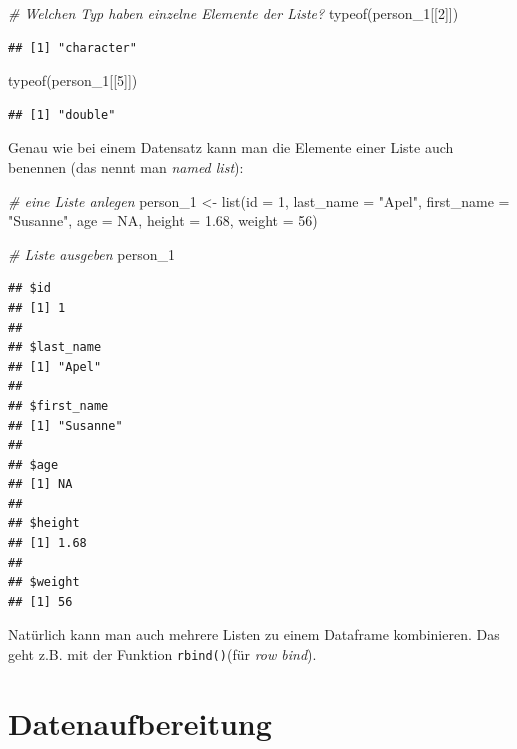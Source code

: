 \documentclass[
]{book}
\newenvironment{Shaded}{\begin{snugshade}}{\end{snugshade}}
\newcommand{\AttributeTok}[1]{\textcolor[rgb]{0.77,0.63,0.00}{#1}}
\newcommand{\CommentTok}[1]{\textcolor[rgb]{0.56,0.35,0.01}{\textit{#1}}}
\newcommand{\ConstantTok}[1]{\textcolor[rgb]{0.00,0.00,0.00}{#1}}
\newcommand{\DecValTok}[1]{\textcolor[rgb]{0.00,0.00,0.81}{#1}}
\newcommand{\FloatTok}[1]{\textcolor[rgb]{0.00,0.00,0.81}{#1}}
\newcommand{\FunctionTok}[1]{\textcolor[rgb]{0.00,0.00,0.00}{#1}}
\newcommand{\NormalTok}[1]{#1}
\newcommand{\OtherTok}[1]{\textcolor[rgb]{0.56,0.35,0.01}{#1}}
\newcommand{\StringTok}[1]{\textcolor[rgb]{0.31,0.60,0.02}{#1}}
\begin{document}
\begin{Shaded}
\begin{Highlighting}[]
\CommentTok{\# Welchen Typ haben einzelne Elemente der Liste?}
\FunctionTok{typeof}\NormalTok{(person\_1[[}\DecValTok{2}\NormalTok{]])}
\end{Highlighting}
\end{Shaded}

\begin{verbatim}
## [1] "character"
\end{verbatim}

\begin{Shaded}
\begin{Highlighting}[]
\FunctionTok{typeof}\NormalTok{(person\_1[[}\DecValTok{5}\NormalTok{]])}
\end{Highlighting}
\end{Shaded}

\begin{verbatim}
## [1] "double"
\end{verbatim}

Genau wie bei einem Datensatz kann man die Elemente einer Liste auch benennen (das nennt man \emph{named list}):

\begin{Shaded}
\begin{Highlighting}[]
\CommentTok{\# eine Liste anlegen}
\NormalTok{person\_1 }\OtherTok{\textless{}{-}} \FunctionTok{list}\NormalTok{(}\AttributeTok{id =} \DecValTok{1}\NormalTok{, }\AttributeTok{last\_name =} \StringTok{"Apel"}\NormalTok{, }\AttributeTok{first\_name =} \StringTok{"Susanne"}\NormalTok{, }\AttributeTok{age =} \ConstantTok{NA}\NormalTok{, }\AttributeTok{height =} \FloatTok{1.68}\NormalTok{, }\AttributeTok{weight =} \DecValTok{56}\NormalTok{)}

\CommentTok{\# Liste ausgeben}
\NormalTok{person\_1}
\end{Highlighting}
\end{Shaded}

\begin{verbatim}
## $id
## [1] 1
## 
## $last_name
## [1] "Apel"
## 
## $first_name
## [1] "Susanne"
## 
## $age
## [1] NA
## 
## $height
## [1] 1.68
## 
## $weight
## [1] 56
\end{verbatim}

Natürlich kann man auch mehrere Listen zu einem Dataframe kombinieren. Das geht z.B. mit der Funktion \texttt{rbind()}(für \emph{row bind}).

\hypertarget{datenaufbereitung}{%
\chapter{Datenaufbereitung}\label{datenaufbereitung}}
\end{document}
